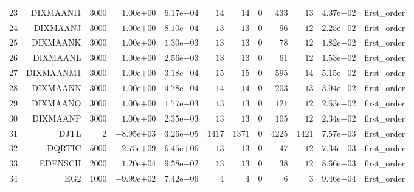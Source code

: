 \begin{longtable}{rrrrrrrrrrrr}
  \(    23\) & DIXMAANI1 & \(  3000\) & \( 1.00\)e\(+00\) & \( 6.17\)e\(-04\) & \(    14\) & \(    14\) & \(     0\) & \(   433\) & \(    13\) & \( 4.37\)e\(-02\) & first\_order \\
  \(    24\) & DIXMAANJ & \(  3000\) & \( 1.00\)e\(+00\) & \( 8.10\)e\(-04\) & \(    13\) & \(    13\) & \(     0\) & \(    96\) & \(    12\) & \( 2.25\)e\(-02\) & first\_order \\
  \(    25\) & DIXMAANK & \(  3000\) & \( 1.00\)e\(+00\) & \( 1.30\)e\(-03\) & \(    13\) & \(    13\) & \(     0\) & \(    78\) & \(    12\) & \( 1.82\)e\(-02\) & first\_order \\
  \(    26\) & DIXMAANL & \(  3000\) & \( 1.00\)e\(+00\) & \( 2.56\)e\(-03\) & \(    13\) & \(    13\) & \(     0\) & \(    61\) & \(    12\) & \( 1.53\)e\(-02\) & first\_order \\
  \(    27\) & DIXMAANM1 & \(  3000\) & \( 1.00\)e\(+00\) & \( 3.18\)e\(-04\) & \(    15\) & \(    15\) & \(     0\) & \(   595\) & \(    14\) & \( 5.15\)e\(-02\) & first\_order \\
  \(    28\) & DIXMAANN & \(  3000\) & \( 1.00\)e\(+00\) & \( 4.78\)e\(-04\) & \(    14\) & \(    14\) & \(     0\) & \(   203\) & \(    13\) & \( 3.94\)e\(-02\) & first\_order \\
  \(    29\) & DIXMAANO & \(  3000\) & \( 1.00\)e\(+00\) & \( 1.77\)e\(-03\) & \(    13\) & \(    13\) & \(     0\) & \(   121\) & \(    12\) & \( 2.63\)e\(-02\) & first\_order \\
  \(    30\) & DIXMAANP & \(  3000\) & \( 1.00\)e\(+00\) & \( 2.35\)e\(-03\) & \(    13\) & \(    13\) & \(     0\) & \(   105\) & \(    12\) & \( 2.34\)e\(-02\) & first\_order \\
  \(    31\) & DJTL & \(     2\) & \(-8.95\)e\(+03\) & \( 3.26\)e\(-05\) & \(  1417\) & \(  1371\) & \(     0\) & \(  4225\) & \(  1421\) & \( 7.57\)e\(-03\) & first\_order \\
  \(    32\) & DQRTIC & \(  5000\) & \( 2.75\)e\(+09\) & \( 6.45\)e\(+06\) & \(    13\) & \(    13\) & \(     0\) & \(    47\) & \(    12\) & \( 7.34\)e\(-03\) & first\_order \\
  \(    33\) & EDENSCH & \(  2000\) & \( 1.20\)e\(+04\) & \( 9.58\)e\(-02\) & \(    13\) & \(    13\) & \(     0\) & \(    38\) & \(    12\) & \( 8.66\)e\(-03\) & first\_order \\
  \(    34\) & EG2 & \(  1000\) & \(-9.99\)e\(+02\) & \( 7.42\)e\(-06\) & \(     4\) & \(     4\) & \(     0\) & \(     6\) & \(     3\) & \( 9.46\)e\(-04\) & first\_order \\

\end{longtable}

